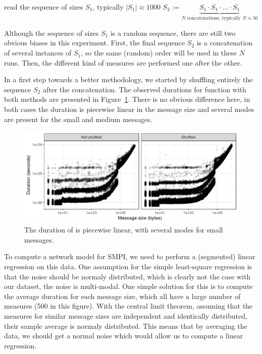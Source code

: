         \begin{algorithm}[H]
            read the sequence of sizes \(S_1\), typically \(|S_1| \approx 1000\)\;
            \(S_2 := \underbrace{S_1\cdot S_1\cdot\dots\cdot S_1}_{N\text{ concatenations, typically } N\approx 50}\)\;
        \end{algorithm}

        Although the sequence of sizes \(S_1\) is a random sequence, there are still two obvious biases in this
        experiment.  First, the final sequence \(S_2\) is a concatenation of several instances of \(S_1\), so the same
        (random) order will be used in these \(N\) runs. Then, the different kind of measures are performed one after
        the other.

        In a first step towards a better methodology, we started by shuffling entirely the sequence \(S_2\) after the
        concatenation. The observed durations for function \recv with both methods are presented in
        Figure~\ref{fig:randomizing_order:raw_data}. There is no obvious difference here, in both cases the duration is
        piecewise linear in the message size and several modes are present for the small and medium messages.

        \begin{figure}[htpb]
            \centering
            \includegraphics[width=0.8\linewidth]{img/experiment/randomizing_order/raw_data.png}
            \caption{The duration of \recv is piecewise linear, with several modes for small messages.}%
            \label{fig:randomizing_order:raw_data}
        \end{figure}

        To compute a network model for SMPI, we need to perform a (segmented) linear regression on this data. One
        assumption for the simple least-square regression is that the noise should be normaly distributed, which is
        clearly not the case with our dataset, the noise is multi-modal. One simple solution for this is to compute the
        average duration for each message size, which all have a large number of measures (500 in this figure). With the
        central limit theorem, assuming that the measures for similar message sizes are independent and identically
        distributed, their sample average is normaly distributed. This means that by averaging the data, we should get a
        normal noise which would allow us to compute a linear regression.

